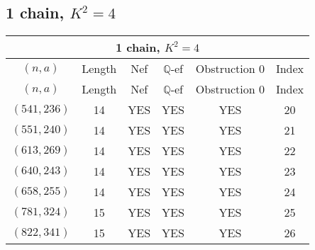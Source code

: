 \subsection{1 chain, \(K^2 = 4\)}
\begin{longtable}{|c|c|c|c|c|c|}
\hline
\multicolumn{6}{|c|}{1 chain, $K^2 = 4$}\\
\hline
$(n,a)$ & Length & Nef & $\mathbb Q$-ef & Obstruction 0 & Index\\
\hline
\endfirsthead

\hline
$(n,a)$ & Length & Nef & $\mathbb Q$-ef & Obstruction 0 & Index\\
\hline
\endhead
\hline
\endfoot

$(541, 236)$ & 14 & YES & YES & YES & 20\\
$(551, 240)$ & 14 & YES & YES & YES & 21\\
$(613, 269)$ & 14 & YES & YES & YES & 22\\
$(640, 243)$ & 14 & YES & YES & YES & 23\\
$(658, 255)$ & 14 & YES & YES & YES & 24\\
$(781, 324)$ & 15 & YES & YES & YES & 25\\
$(822, 341)$ & 15 & YES & YES & YES & 26
\end{longtable}
